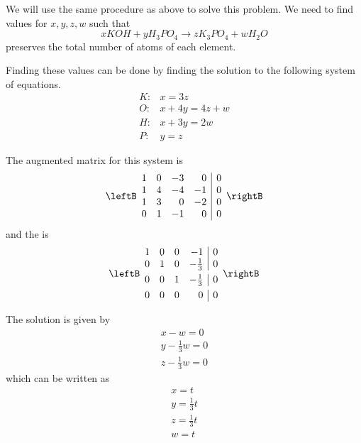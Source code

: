 \begin{solution}
We will use the same procedure as above to solve this problem. We need to find values for 
$x,y,z,w$ such that  
\begin{equation*}
xKOH+yH_{3}PO_{4}\rightarrow zK_{3}PO_{4}+wH_{2}O
\end{equation*}
preserves the total number of atoms of each element. 

Finding these values can be done by finding the solution to the following system of equations.
\begin{equation*}
\begin{array}{cl}
K: & x=3z \\ 
O: & x+4y=4z+w \\ 
H: & x+3y=2w \\ 
P: & y=z
\end{array}
\end{equation*}

The augmented matrix for this system is 
\begin{equation*}
\leftB 
\begin{array}{rrrr|r}
1 & 0 & -3 & 0 & 0 \\ 
1 & 4 & -4 & -1 & 0 \\ 
1 & 3 & 0 & -2 & 0 \\ 
0 & 1 & -1 & 0 & 0
\end{array}
\rightB
\end{equation*}
and the \rref \;is
\begin{equation*}
\leftB
\begin{array}{rrrr|r}
1 & 0 & 0 & -1 & 0 \\ 
0 & 1 & 0 & -\vspace{0.05in}\frac{1}{3} & 0 \\ 
0 & 0 & 1 & -\vspace{0.05in}\frac{1}{3} & 0 \\ 
0 & 0 & 0 & 0 & 0
\end{array}
\rightB
\end{equation*}

The solution is given by 
\begin{equation*}
\begin{array}{c}
x - w = 0 \\
y - \frac{1}{3}w = 0 \\
z - \frac{1}{3}w = 0
\end{array}
\end{equation*}
which can be written as
\begin{equation*}
\begin{array}{c}
x = t \\
y = \frac{1}{3}t \\
z = \frac{1}{3}t \\
w = t
\end{array}
\end{equation*}


\end{solution}
